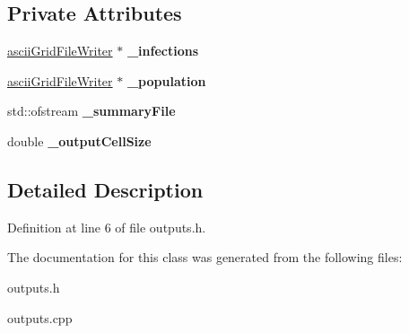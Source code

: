 \subsection*{Private Attributes}
\begin{DoxyCompactItemize}
\item 
\mbox{\label{classoutputs_a8709cb5dd3d58f640cb7194c85b50a18}} 
\mbox{\hyperlink{classasciiGridFileWriter}{ascii\+Grid\+File\+Writer}} $\ast$ {\bfseries \+\_\+infections}
\item 
\mbox{\label{classoutputs_aac86ef701212c43f126fde0a5755109b}} 
\mbox{\hyperlink{classasciiGridFileWriter}{ascii\+Grid\+File\+Writer}} $\ast$ {\bfseries \+\_\+population}
\item 
\mbox{\label{classoutputs_a3a31a7714910a5278a6a5b00df1d0499}} 
std\+::ofstream {\bfseries \+\_\+summary\+File}
\item 
\mbox{\label{classoutputs_aafdf08a7e20b742367f48fb1cdbc74b8}} 
double {\bfseries \+\_\+output\+Cell\+Size}
\end{DoxyCompactItemize}


\subsection{Detailed Description}


Definition at line 6 of file outputs.\+h.



The documentation for this class was generated from the following files\+:\begin{DoxyCompactItemize}
\item 
outputs.\+h\item 
outputs.\+cpp\end{DoxyCompactItemize}
